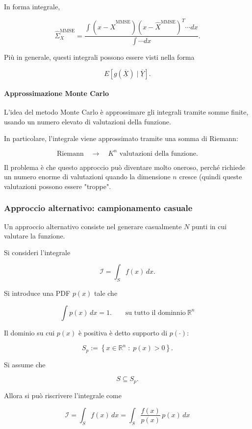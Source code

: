 \documentclass[11pt,a4paper]{article}
\begin{document}
In forma integrale,

\[
\hat\Sigma_X^{\mathrm{MMSE}}
=
\frac{
\displaystyle
\int
(x-\hat X^{\mathrm{MMSE}})
(x-\hat X^{\mathrm{MMSE}})^T \cdots dx
}{
\displaystyle
\int
\cdots dx
}.
\]

Più in generale, questi integrali possono essere visti nella forma

\[
E[g(\overline{\underline{X}})\mid \overline{\underline{Y}}].
\]

\paragraph{Approssimazione Monte Carlo}

L'idea del metodo Monte Carlo è approssimare gli integrali tramite somme finite, usando un numero elevato di valutazioni della funzione.

In particolare, l'integrale viene approssimato tramite una somma di Riemann:

\[
\text{Riemann}
\quad\longrightarrow\quad
K^n \text{ valutazioni della funzione}.
\]

Il problema è che questo approccio può diventare molto oneroso, perché richiede un numero enorme di valutazioni quando la dimensione \(n\) cresce (quindi queste valutazioni possono essere "troppe".

\subsubsection*{Approccio alternativo: campionamento casuale}

Un approccio alternativo consiste nel generare casualmente \(N\) punti in cui valutare la funzione.

Si consideri l'integrale

\[
\mathcal{I}=\int_S f(x)\,dx.
\]

Si introduce una PDF \(p(x)\) tale che 

\[
\int p(x)\,dx=1. \qquad \text{su tutto il dominnio} \ \mathbb{R}^n
\]

Il dominio su cui \(p(x)\) è positiva è detto supporto di \(p(\cdot)\):

\[
S_p := \left\{x\in\mathbb{R}^n \;:\; p(x)>0\right\}.
\]

Si assume che

\[
S\subseteq S_p.
\]

Allora si può riscrivere l'integrale come

\[
\mathcal{I}
=
\int_S f(x)\,dx
=
\int_S \frac{f(x)}{p(x)}\,p(x)\,dx
\]
\end{document}
